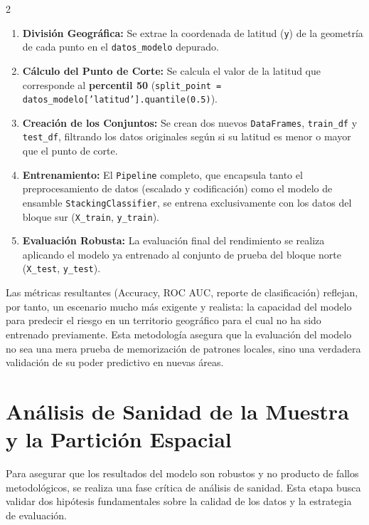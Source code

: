 \documentclass[a4paper,10pt]{article}
\begin{document}
\begin{multicols}{2}
\begin{enumerate}
    \item \textbf{División Geográfica:} Se extrae la coordenada de latitud (\texttt{y}) de la geometría de cada punto en el \texttt{datos\_modelo} depurado.

    \item \textbf{Cálculo del Punto de Corte:} Se calcula el valor de la latitud que corresponde al \textbf{percentil 50} (\texttt{split\_point = datos\_modelo['latitud'].quantile(0.5)}).

    \item \textbf{Creación de los Conjuntos:} Se crean dos nuevos \texttt{DataFrames}, \texttt{train\_df} y \texttt{test\_df}, filtrando los datos originales según si su latitud es menor o mayor que el punto de corte.

    \item \textbf{Entrenamiento:} El \texttt{Pipeline} completo, que encapsula tanto el preprocesamiento de datos (escalado y codificación) como el modelo de ensamble \texttt{StackingClassifier}, se entrena exclusivamente con los datos del bloque sur (\texttt{X\_train}, \texttt{y\_train}).

    \item \textbf{Evaluación Robusta:} La evaluación final del rendimiento se realiza aplicando el modelo ya entrenado al conjunto de prueba del bloque norte (\texttt{X\_test}, \texttt{y\_test}).
\end{enumerate}

Las métricas resultantes (Accuracy, ROC AUC, reporte de clasificación) reflejan, por tanto, un escenario mucho más exigente y realista: la capacidad del modelo para predecir el riesgo en un territorio geográfico para el cual no ha sido entrenado previamente. Esta metodología asegura que la evaluación del modelo no sea una mera prueba de memorización de patrones locales, sino una verdadera validación de su poder predictivo en nuevas áreas.


\section{Análisis de Sanidad de la Muestra y la Partición Espacial}

Para asegurar que los resultados del modelo son robustos y no producto de fallos metodológicos, se realiza una fase crítica de análisis de sanidad. Esta etapa busca validar dos hipótesis fundamentales sobre la calidad de los datos y la estrategia de evaluación.


\end{multicols}
\end{document}
